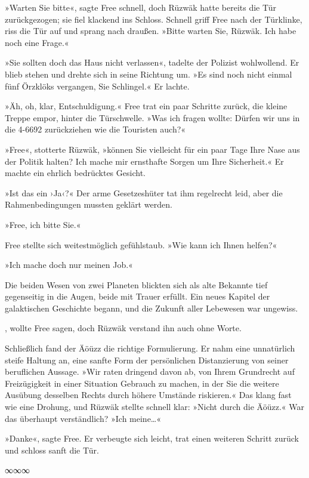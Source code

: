 »Warten Sie bitte«, sagte Free schnell, doch Rüzwäk hatte bereits die Tür zurückgezogen; sie fiel klackend ins Schloss. Schnell griff Free nach der Türklinke, riss die Tür auf und sprang nach draußen. »Bitte warten Sie, Rüzwäk. Ich habe noch eine Frage.«

»Sie sollten doch das Haus nicht verlassen«, tadelte der Polizist wohlwollend. Er blieb stehen und drehte sich in seine Richtung um. »Es sind noch nicht einmal fünf Örzklöks vergangen, Sie Schlingel.« Er lachte.

»Äh, oh, klar, Entschuldigung.« Free trat ein paar Schritte zurück, die kleine Treppe empor, hinter die Türschwelle. »Was ich fragen wollte: Dürfen wir uns in die 4-6692 zurückziehen wie die Touristen auch?«

»Free«, stotterte Rüzwäk, »können Sie vielleicht für ein paar Tage Ihre Nase aus der Politik halten? Ich mache mir ernsthafte Sorgen um Ihre Sicherheit.« Er machte ein ehrlich bedrücktes Gesicht.

»Ist das ein ›Ja‹?« Der arme Gesetzeshüter tat ihm regelrecht leid, aber die Rahmenbedingungen mussten geklärt werden.

»Free, ich bitte Sie.«

Free stellte sich weitestmöglich gefühlstaub. »Wie kann ich Ihnen helfen?«

»Ich mache doch nur meinen Job.«

Die beiden Wesen von zwei Planeten blickten sich als alte Bekannte tief gegenseitig in die Augen, beide mit Trauer erfüllt. Ein neues Kapitel der galaktischen Geschichte begann, und die Zukunft aller Lebewesen war ungewiss.

, wollte Free sagen, doch Rüzwäk verstand ihn auch ohne Worte.

Schließlich fand der Äöüzz die richtige Formulierung. Er nahm eine unnatürlich steife Haltung an, eine sanfte Form der persönlichen Distanzierung von seiner beruflichen Aussage. »Wir raten dringend davon ab, von Ihrem Grundrecht auf Freizügigkeit in einer Situation Gebrauch zu machen, in der Sie die weitere Ausübung desselben Rechts durch höhere Umstände riskieren.« Das klang fast wie eine Drohung, und Rüzwäk stellte schnell klar: »Nicht durch die Äöüzz.« War das überhaupt verständlich? »Ich meine…«

»Danke«, sagte Free. Er verbeugte sich leicht, trat einen weiteren Schritt zurück und schloss sanft die Tür.

\begin{center}
∞∞∞
\end{center}

